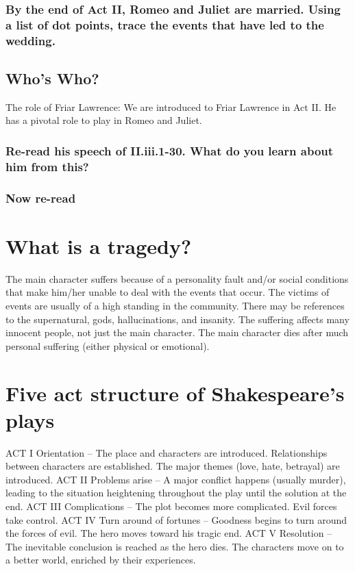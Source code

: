 \documentclass{article}
\begin{document}
\subsubsection{By the end of Act II, Romeo and Juliet are married. Using a list of dot points, trace the events that have led to the wedding.}
\begin{outline}

\end{outline}
\subsection{Who's Who?}
The role of Friar Lawrence: We are introduced to Friar Lawrence in Act II. He has a pivotal role to play in Romeo and Juliet.
\subsubsection{Re-read his speech of II.iii.1-30. What do you learn about him from this?}
\subsubsection{Now re-read}

\section{What is a tragedy?}
\begin{outline}
\1 The main character suffers because of a personality fault and/or social conditions that make him/her unable to deal with the events that occur. 
\1 The victims of events are usually of a high standing in the community. 
\1 There may be references to the supernatural, gods, hallucinations, and insanity. 
\1 The suffering affects many innocent people, not just the main character. 
\1 The main character dies after much personal suffering (either physical or emotional).
\end{outline}

\section{Five act structure of Shakespeare's plays}
\begin{outline}
\1 ACT I
\2 Orientation -- The place and characters are introduced. Relationships between characters are established. The major themes (love, hate, betrayal) are introduced.
\1 ACT II
\2 Problems arise -- A major conflict happens (usually murder), leading to the situation heightening throughout the play until the solution at the end.
\1 ACT III
\2 Complications -- The plot becomes more complicated. Evil forces take control.
\1 ACT IV
\2 Turn around of fortunes -- Goodness begins to turn around the forces of evil. The hero moves toward his tragic end.
\1 ACT V
\2 Resolution -- The inevitable conclusion is reached as the hero dies. The characters move on to a better world, enriched by their experiences.
\end{outline}
\end{document}
